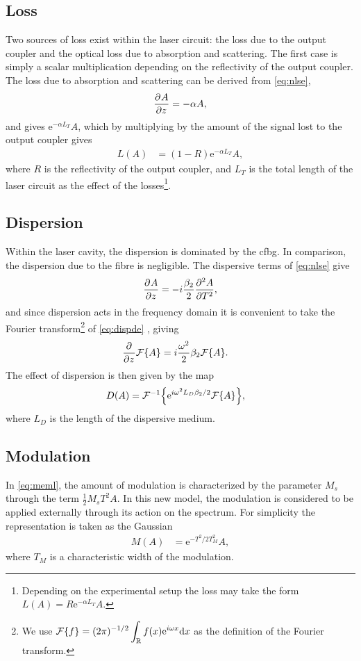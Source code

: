 \subsection{Loss}
Two sources of loss exist within the laser circuit: the loss due to the output coupler and the optical loss due to absorption and scattering. The first case is simply a scalar multiplication depending on the reflectivity of the output coupler. The loss due to absorption and scattering can be derived from \eqref{eq:nlse},
\begin{align*}
\frac{\partial^{}A}{\partial{z}^{}} = - \alpha A,
\end{align*}
and gives $\textrm{e}^{-\alpha L_T}A$, which by multiplying by the amount of the signal lost to the output coupler gives
\begin{align*}
L(A) &= (1 - R) \textrm{e}^{- \alpha L_T}A,
\end{align*}
where $R$ is the reflectivity of the output coupler, and $L_T$ is the total length of the laser circuit as the effect of the losses\footnote{Depending on the experimental setup the loss may take the form $L(A) = R \textrm{e}^{- \alpha L_T}A$.}.

\subsection{Dispersion}
Within the laser cavity, the dispersion is dominated by the \gls{cfbg}. In comparison, the dispersion due to the fibre is negligible. The dispersive terms of \eqref{eq:nlse} give
\begin{align}
\label{eq:dispde}
	\pdiff{A}{z} = -i \frac{\beta_2}{2} \pdiff[2]{A}{T},
\end{align}
and since dispersion acts in the frequency domain it is convenient to take the Fourier transform\footnote{We use $\displaystyle \FT{f} = (2 \pi)^{-1/2} \int_\mathbb{R} f(x) \textrm{e}^{i \omega x} \df x$ as the definition of the Fourier transform.} of \eqref{eq:dispde} \cite{debnath, gradshteyn}, giving
\begin{align*}
	\pdiff{}{z}\FT{A} &= i\frac{\omega^2}{2}\beta_2 \FT{A}.
\end{align*}
The effect of dispersion is then given by the map
\begin{align*}
D(A) &= \FTi{\textrm{e}^{i \omega^2 L_D\beta_2/2} \FT{A}},
\end{align*}
where $L_D$ is the length of the dispersive medium. \\

\subsection{Modulation}
In \eqref{eq:meml}, the amount of modulation is characterized by the parameter $M_s$ through the term $\frac{1}{2} M_s T^2 A$. In this new model, the modulation is considered to be applied externally through its action on the spectrum. For simplicity the representation is taken as the Gaussian
\begin{align*}
M(A) &= \textrm{e}^{-T^2 / 2 T_M^2} A,
\end{align*}
where $T_M$ is a characteristic width of the modulation. \\

